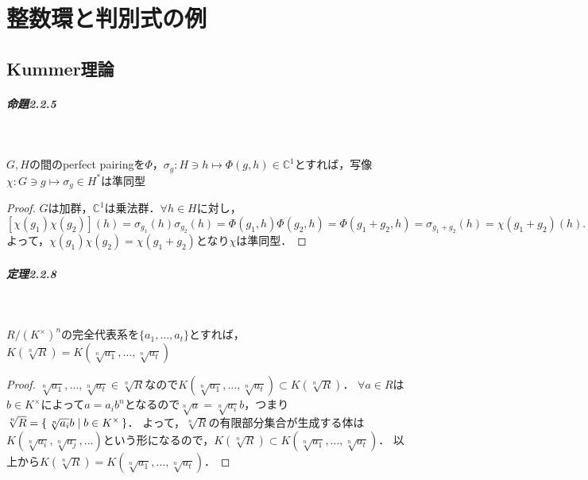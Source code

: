 \chapter{整数環と判別式の例}
\setcounter{section}{1}
\section{Kummer理論}
\paragraph{命題2.2.5}~
\begin{screen}
  $G, H$の間のperfect pairingを$\Phi$，$\sigma_g\colon H\ni h\mapsto\Phi(g, h)\in\mathbb{C}^1$とすれば，写像$\chi\colon G\ni g\mapsto\sigma_g\in H^\ast$は準同型
\end{screen}
\begin{proof}
  $G$は加群，$\mathbb{C}^1$は乗法群．$\forall h\in H$に対し，
  \[\left[\chi(g_1)\chi(g_2)\right](h)=\sigma_{g_1}(h)\sigma_{g_2}(h)=\Phi(g_1, h)\Phi(g_2, h)=\Phi(g_1+g_2, h)=\sigma_{g_1+g_2}(h)=\chi(g_1+g_2)(h).\]
  よって，$\chi(g_1)\chi(g_2)=\chi(g_1+g_2)$となり$\chi$は準同型．
\end{proof}

\paragraph{定理2.2.8}~
\begin{screen}
  $R/(K^\times)^n$の完全代表系を$\{a_1, \ldots, a_t\}$とすれば，$K(\sqrt[n]{R})=K(\sqrt[n]{a_1}, \ldots, \sqrt[n]{a_t})$
\end{screen}
\begin{proof}
  $\sqrt[n]{a_1}, \ldots, \sqrt[n]{a_t}\in\sqrt[n]{R}$なので$K(\sqrt[n]{a_1}, \ldots, \sqrt[n]{a_t})\subset K(\sqrt[n]{R})$．
  $\forall a\in R$は$b\in K^\times$によって$a=a_ib^n$となるので$\sqrt[n]{a}=\sqrt[n]{a_i}b$，つまり$\sqrt[n]{R}=\set{\sqrt[n]{a_i}b | b\in K^\times}$．
  よって，$\sqrt[n]{R}$の有限部分集合が生成する体は$K(\sqrt[n]{a_i}, \sqrt[n]{a_j}, \ldots)$という形になるので，$K(\sqrt[n]{R})\subset K(\sqrt[n]{a_1}, \ldots, \sqrt[n]{a_t})$．
  以上から$K(\sqrt[n]{R})=K(\sqrt[n]{a_1}, \ldots, \sqrt[n]{a_t})$．
\end{proof}

